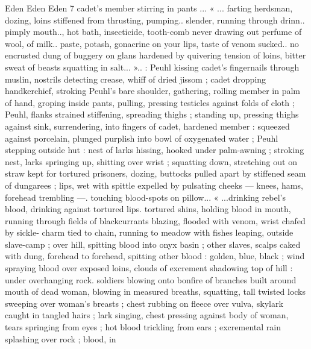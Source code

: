 Eden Eden Eden 7
cadet's member stirring in pants ... « ... farting herdsman, dozing,
loins stiffened from thrusting, pumping.. slender, running through
drinn.. pimply mouth.., hot bath, insecticide, tooth-comb never
drawing out perfume of wool, of milk.. paste, potash, gonacrine on
your lips, taste of venom sucked.. no encrusted dung of buggery on
glans hardened by quivering tension of loins, bitter sweat of beasts
squatting in salt... ».. : Peuhl kissing cadet's fingernails through
muslin, nostrils detecting crease, whiff of dried jissom ; cadet
dropping handkerchief, stroking Peuhl’s bare shoulder, gathering,
rolling member in palm of hand, groping inside pants, pulling,
pressing testicles against folds of cloth ; Peuhl, flanks strained
stiffening, spreading thighs ; standing up, pressing thighs against
sink, surrendering, into fingers of cadet, hardened member :
squeezed against porcelain, plunged purplish into bowl of
oxygenated water ; Peuhl stepping outside hut : nest of larks hissing,
hooked under palm-awning ; stroking nest, larks springing up,
shitting over wrist ; squatting down, stretching out on straw kept for
tortured prisoners, dozing, buttocks pulled apart by stiffened seam
of dungarees ; lips, wet with spittle expelled by pulsating cheeks —
knees, hams, forehead trembling —. touching blood-spots on
pillow... « ...drinking rebel's blood, drinking against tortured lips.
tortured shins, holding blood in mouth, running through fields of
blackcurrants blazing, flooded with venom, wrist chafed by sickle-
charm tied to chain, running to meadow with fishes leaping, outside
slave-camp ; over hill, spitting blood into onyx basin ; other slaves,
scalps caked with dung, forehead to forehead, spitting other blood :
golden, blue, black ; wind spraying blood over exposed loins, clouds
of excrement shadowing top of hill : under overhanging rock.
soldiers blowing onto bonfire of branches built around mouth of
dead woman, blowing in measured breaths, squatting, tall twisted
locks sweeping over woman's breasts ; chest rubbing on fleece over
vulva, skylark caught in tangled hairs ; lark singing, chest pressing
against body of woman, tears springing from eyes ; hot blood
trickling from ears ; excremental rain splashing over rock ; blood, in


